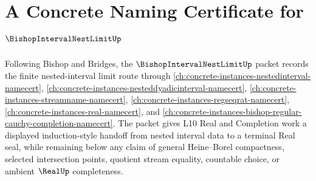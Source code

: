 \chapter{A Concrete Naming Certificate for $\BishopIntervalNestLimitUp$}
\label{ch:concrete-instances-bishop-interval-nest-limit-namecert}

Following Bishop and Bridges, the $\BishopIntervalNestLimitUp$ packet records the finite nested-interval limit route through \autoref{ch:concrete-instances-nestedinterval-namecert}, \autoref{ch:concrete-instances-nesteddyadicinterval-namecert}, \autoref{ch:concrete-instances-streamname-namecert}, \autoref{ch:concrete-instances-regseqrat-namecert}, \autoref{ch:concrete-instances-real-namecert}, and \autoref{ch:concrete-instances-bishop-regular-cauchy-completion-namecert}. The packet gives L10 Real and Completion work a displayed induction-style handoff from nested interval data to a terminal Real seal, while remaining below any claim of general Heine--Borel compactness, selected intersection points, quotient stream equality, countable choice, or ambient $\RealUp$ completeness.

